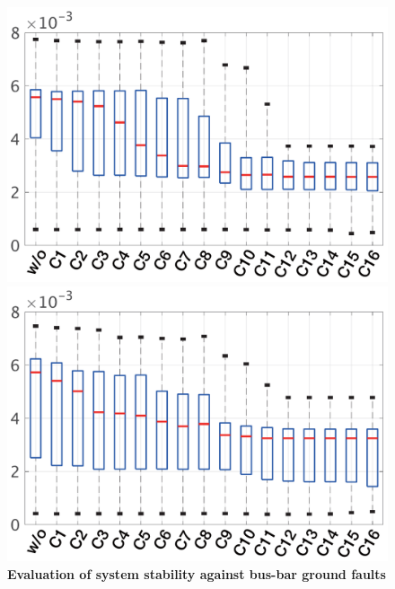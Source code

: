 \documentclass[tombow,dvipdfmx]{corona-a5-1.1}
\begin{document}
\begin{figure}[t!]
  \centering
  {
  \begin{minipage}{0.49\linewidth}
    \centering
    \includegraphics[width = 1.0\linewidth]{figs/boxplotgen}
  \end{minipage}
  \begin{minipage}{0.49\linewidth}
    \centering
    \includegraphics[width = 1.0\linewidth]{figs/boxplotload}
  \end{minipage}
  \medskip
  \caption{\textbf{Evaluation of system stability against bus-bar ground faults} }
  \label{fig:boxplots}
  }
\medskip
\end{figure}
\end{document}
